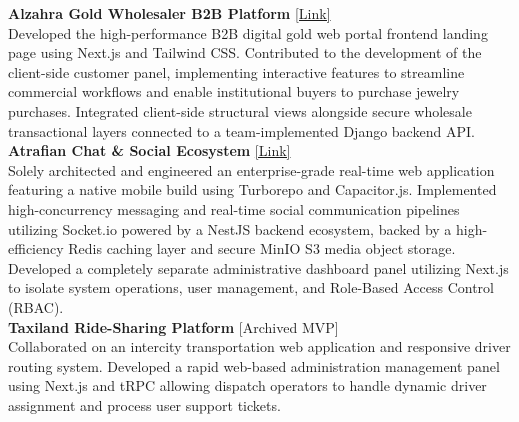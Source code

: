 \documentclass[a4paper,9pt]{extarticle}
\begin{document}
	\noindent
	\textbf{Alzahra Gold Wholesaler B2B Platform} \hfill \small{\href{http://app.alzahragold.com/}{[Link]}} \vspace*{2pt} \\
	Developed the high-performance B2B digital gold web portal frontend landing page using Next.js and Tailwind CSS. Contributed to the development of the client-side customer panel, implementing interactive features to streamline commercial workflows and enable institutional buyers to purchase jewelry purchases. Integrated client-side structural views alongside secure wholesale transactional layers connected to a team-implemented Django backend API. \vspace{6pt} \\
	
	\noindent
	\textbf{Atrafian Chat \& Social Ecosystem} \hfill \small{\href{https://atrafian.ir}{[Link]}} \vspace*{2pt} \\ 
	Solely architected and engineered an enterprise-grade real-time web application featuring a native mobile build using Turborepo and Capacitor.js. Implemented high-concurrency messaging and real-time social communication pipelines utilizing Socket.io powered by a NestJS backend ecosystem, backed by a high-efficiency Redis caching layer and secure MinIO S3 media object storage. Developed a completely separate administrative dashboard panel utilizing Next.js to isolate system operations, user management, and Role-Based Access Control (RBAC). \vspace{6pt} \\
	
	\noindent
	\textbf{Taxiland Ride-Sharing Platform} \hfill \small{[Archived MVP]} \vspace*{2pt} \\
	Collaborated on an intercity transportation web application and responsive driver routing system. Developed a rapid web-based administration management panel using Next.js and tRPC allowing dispatch operators to handle dynamic driver assignment and process user support tickets.\vspace{6pt} \\
	
\end{document}
